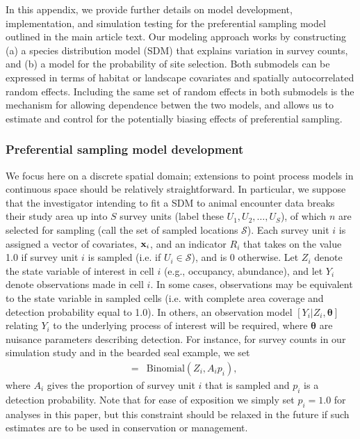 \documentclass[times,mee,doublespace,]{besauth2}
\begin{document}
\begin{flushleft}

\raggedbottom

In this appendix, we provide further details on model development, implementation, and simulation testing for the preferential sampling model outlined in the main article text. Our modeling approach works by constructing (a) a species distribution model (SDM) that explains variation in survey counts, and (b) a model for the probability of site selection.  Both submodels can be expressed in terms of habitat or landscape covariates and spatially autocorrelated random effects.  Including the same set of random effects in both submodels is the mechanism for allowing dependence betwen the two models, and allows us to estimate and control for the potentially biasing effects of preferential sampling.

\subsubsection*{Preferential sampling model development}

We focus here on a discrete spatial domain; extensions to point process models in continuous space should be relatively straightforward.  In particular, we suppose that the investigator intending to fit a SDM to animal encounter data breaks their study area up into $S$ survey units (label these $U_1, U_2, \hdots, U_S$), of which $n$ are selected for sampling (call the set of sampled locations $\mathcal{S}$).
Each survey unit $i$ is assigned a vector of covariates, ${\bf x}_i$, and an indicator $R_i$ that takes on the value 1.0 if survey unit $i$ is sampled (i.e. if $U_i \in \mathcal{S}$), and is 0 otherwise.  Let $Z_i$ denote the state variable of interest in cell $i$ (e.g., occupancy, abundance), and let $Y_i$ denote observations made in cell $i$.  In some cases, observations may be equivalent to the state variable in sampled cells (i.e. with complete area coverage and detection probability equal to 1.0).  In others, an observation model $[Y_i | Z_i, \boldsymbol{\theta}]$ relating $Y_i$ to the underlying process of interest will be required, where $\boldsymbol{\theta}$ are nuisance parameters describing detection.  For instance, for survey counts in our simulation study and in the bearded seal example, we set
\begin{eqnarray*}
  [Y_i | Z_i, \boldsymbol{\theta}] & = & \textrm{Binomial}(Z_i, A_i p_i),
\end{eqnarray*}
where $A_i$ gives the proportion of survey unit $i$ that is sampled and $p_i$ is a detection probability.  Note that for ease of exposition we simply set $p_i = 1.0$ for analyses in this paper, but this constraint should be relaxed in the future if such estimates are to be used in conservation or management.


\end{flushleft}
\end{document}
